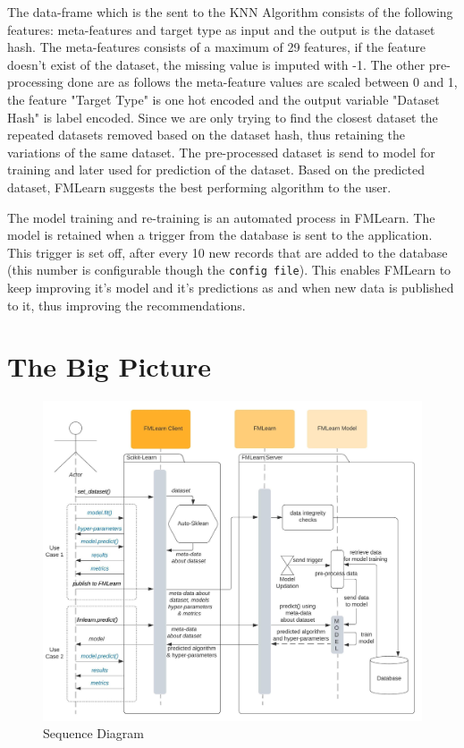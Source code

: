 The data-frame which is the sent to the KNN Algorithm consists of the following features: meta-features and target type as input and the output is the dataset hash. The meta-features consists of a maximum of 29 features, if the feature doesn't exist of the dataset, the missing value is imputed with -1. The other pre-processing done are as follows the meta-feature values are scaled between 0 and 1, the feature "Target Type" is one hot encoded and the output variable "Dataset Hash" is label encoded. Since we are only trying to find the closest dataset the repeated datasets removed based on the dataset hash, thus retaining the variations of the same dataset. The pre-processed dataset is send to model for training and later used for prediction of the dataset. Based on the predicted dataset, FMLearn suggests the best performing algorithm to the user.

The model training and re-training is an automated process in FMLearn. The model is retained when a trigger from the database is sent to the application. This trigger is set off, after every 10 new records that are added to the database (this number is configurable though the \texttt{config file}). This enables FMLearn to keep improving it's model and it's predictions as and when new data is published to it, thus improving the recommendations.

\section{The Big Picture}



\begin{figure}[H]
    \centering
    \includegraphics[width=15cm]{images/Sequence Diagram.jpeg}
    \caption{Sequence Diagram}
    \label{sequence-diagram}
\end{figure}


